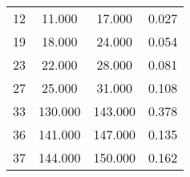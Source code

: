 % 
\begin{tabular}{cccc}
  \hline
  \hline
12 & 11.000 & 17.000 & 0.027 \\ 
  19 & 18.000 & 24.000 & 0.054 \\ 
  23 & 22.000 & 28.000 & 0.081 \\ 
  27 & 25.000 & 31.000 & 0.108 \\ 
  33 & 130.000 & 143.000 & 0.378 \\ 
  36 & 141.000 & 147.000 & 0.135 \\ 
  37 & 144.000 & 150.000 & 0.162 \\ 
   \hline
\end{tabular}
